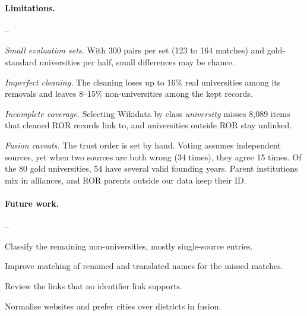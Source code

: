 \documentclass[runningheads,a4paper]{llncs}
\newenvironment{steps}[1][0.8em]{\begin{list}{--}{\setlength{\labelwidth}{#1}\setlength{\labelsep}{0.3em}%
\setlength{\leftmargin}{\dimexpr\labelwidth+\labelsep\relax}%
\setlength{\itemsep}{0pt}\setlength{\parsep}{0pt}\setlength{\topsep}{2pt}}}%
{\end{list}}
\begin{document}
\paragraph{Limitations.}
\begin{steps}
\item \emph{Small evaluation sets.} With 300 pairs per set (123 to 164 matches) and \goldUsed{}
gold-standard universities per half, small differences may be chance.
\item \emph{Imperfect cleaning.} The cleaning loses up to 16\% real universities among its removals and
leaves 8--15\% non-universities among the kept records.
\item \emph{Incomplete coverage.} Selecting Wikidata by class \emph{university} misses 8,089 items that
cleaned ROR records link to, and universities outside ROR stay unlinked.
\item \emph{Fusion caveats.} The trust order is set by hand. Voting assumes independent sources, yet when
two sources are both wrong (34 times), they agree 15 times. Of the 80 gold universities, 54 have several valid
founding years. Parent institutions mix in alliances, and ROR parents outside our data keep their ID.
\end{steps}

\paragraph{Future work.}
\begin{steps}
\item Classify the remaining non-universities, mostly single-source entries.
\item Improve matching of renamed and translated names for the missed matches.
\item Review the links that no identifier link supports.
\item Normalise websites and prefer cities over districts in fusion.
\end{steps}



\end{document}
